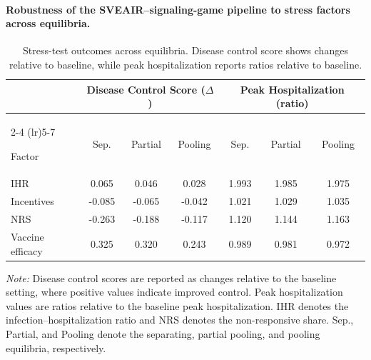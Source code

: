 \documentclass[sigconf,review]{acmart}
\begin{document}
\paragraph{Robustness of the SVEAIR–signaling-game pipeline to stress factors across equilibria.}

\begin{table}[h]
\centering
\caption{Stress-test outcomes across equilibria. Disease control score shows
changes relative to baseline, while peak hospitalization reports ratios
relative to baseline.}
\label{tab:stress}

\vspace{-2mm}
\small
\setlength{\tabcolsep}{2.5pt}
\renewcommand{\arraystretch}{.95}

\begin{tabular}{@{}lcccccc@{}}
\toprule
& \multicolumn{3}{c}{Disease Control Score ($\Delta$)}
& \multicolumn{3}{c}{Peak Hospitalization (ratio)} \\
\cmidrule(lr){2-4}
\cmidrule(lr){5-7}

Factor 
& Sep.
& Partial
& Pooling
& Sep.
& Partial
& Pooling \\

\midrule

IHR
& 0.065
& 0.046
& 0.028
& 1.993
& 1.985
& 1.975 \\

Incentives
& -0.085
& -0.065
& -0.042
& 1.021
& 1.029
& 1.035 \\

NRS
& -0.263
& -0.188
& -0.117
& 1.120
& 1.144
& 1.163 \\

Vaccine efficacy
& 0.325
& 0.320
& 0.243
& 0.989
& 0.981
& 0.972 \\

\bottomrule
\end{tabular}
\vspace{1mm} \parbox{\columnwidth}{ \footnotesize \textit{Note:} Disease control scores are reported as changes relative to the baseline setting, where positive values indicate improved control. Peak hospitalization values are ratios relative to the baseline peak hospitalization. IHR denotes the infection--hospitalization ratio and NRS denotes the non-responsive share. Sep., Partial, and Pooling denote the separating, partial pooling, and pooling equilibria, respectively. }
\vspace{-5mm}
\end{table}
\end{document}
